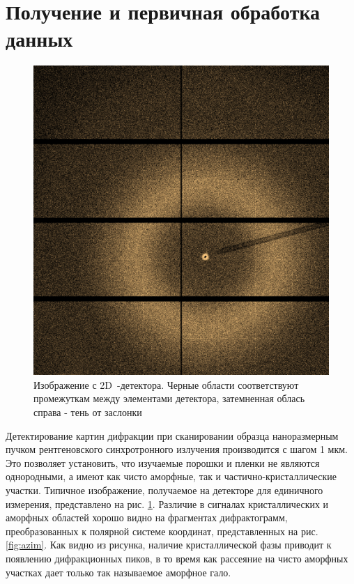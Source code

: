 	\section{Получение и первичная обработка данных}
	
	
			\begin{figure}
\singlespacing
\vspace{-35px}
    \includegraphics[width=0.9\linewidth]{fig/obj.png}
    \vspace{3px}
    \caption{Изображение с 2D~-детектора. Черные области соответствуют промежуткам между элементами детектора, затемненная облась справа  - тень от заслонки}
    \label{fig:difractogram}
\end{figure}
	
	
	Детектирование картин дифракции при сканировании образца наноразмерным пучком рентгеновского синхротронного излучения производится с шагом 1 мкм. 
	Это позволяет установить, что изучаемые порошки и пленки не являются однородными, а имеют как чисто аморфные, так и частично-кристаллические участки.
	Типичное изображение, получаемое на детекторе для единичного измерения, представлено на рис. \ref{fig:difractogram}. Различие в сигналах кристаллических и аморфных областей хорошо видно на фрагментах дифрактограмм, преобразованных к полярной системе координат, представленных на рис. \ref{fig:azim}. Как видно из рисунка, наличие кристаллической фазы приводит к появлению  дифракционных пиков, в то время как рассеяние на чисто аморфных участках дает только так называемое аморфное гало.
	
